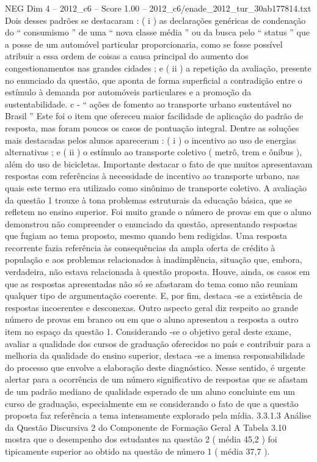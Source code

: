 \begin{textsample}{NEG Dim 4 – 2012\_c6 – Score 1.00 – 2012\_c6/enade\_2012\_tur\_30ab177814.txt}
Dois desses padrões se destacaram : ( i ) as declarações genéricas de condenação do “ consumismo ” de uma “ nova classe média ” ou da busca pelo “ status ” que a posse de um automóvel particular proporcionaria, como se fosse possível atribuir a essa ordem de coisas a causa principal do aumento dos congestionamentos nas grandes cidades ; e ( ii ) a repetição da avaliação, presente no enunciado da questão, que aponta de forma superficial a contradição entre o estímulo à demanda por automóveis particulares e a promoção da sustentabilidade. c - “ ações de fomento ao transporte urbano sustentável no Brasil ” Este foi o item que ofereceu maior facilidade de aplicação do padrão de resposta, mas foram poucos os casos de pontuação integral.
Dentre as soluções mais destacadas pelos alunos apareceram : ( i ) o incentivo ao uso de energias alternativas ; e ( ii ) o estímulo ao transporte coletivo ( metrô, trem e ônibus ), além do uso de bicicletas.
Importante destacar o fato de que muitos apresentavam respostas com referências à necessidade de incentivo ao transporte urbano, nas quais este termo era utilizado como sinônimo de transporte coletivo.
A avaliação da questão 1 trouxe à tona problemas estruturais da educação básica, que se refletem no ensino superior.
Foi muito grande o número de provas em que o aluno demonstrou não compreender o enunciado da questão, apresentando respostas que fugiam ao tema proposto, mesmo quando bem redigidas.
Uma resposta recorrente fazia referência às consequências da ampla oferta de crédito à população e aos problemas relacionados à inadimplência, situação que, embora, verdadeira, não estava relacionada à questão proposta.
Houve, ainda, os casos em que as respostas apresentadas não só se afastaram do tema como não reuniam qualquer tipo de argumentação coerente.
E, por fim, destaca -se a existência de respostas incoerentes e desconexas.
Outro aspecto geral diz respeito ao grande número de provas em branco ou em que o aluno apresentou a resposta a outro item no espaço da questão 1.
Considerando -se o objetivo geral deste exame, avaliar a qualidade dos cursos de graduação oferecidos no país e contribuir para a melhoria da qualidade do ensino superior, destaca -se a imensa responsabilidade do processo que envolve a elaboração deste diagnóstico.
Nesse sentido, é urgente alertar para a ocorrência de um número significativo de respostas que se afastam de um padrão mediano de qualidade esperado de um aluno concluinte em um curso de graduação, especialmente em se considerando o fato de que a questão proposta faz referência a tema intensamente explorado pela mídia. 3.3.1.3 Análise da Questão Discursiva 2 do Componente de Formação Geral A Tabela 3.10 mostra que o desempenho dos estudantes na questão 2 ( média 45,2 ) foi tipicamente superior ao obtido na questão de número 1 ( média 37,7 ).

\end{textsample}
